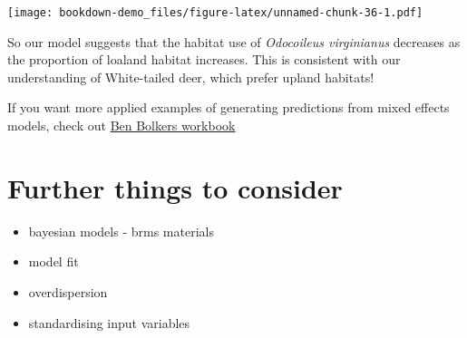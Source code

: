 \documentclass[]{book}
\newenvironment{Shaded}{\begin{snugshade}}{\end{snugshade}}
\newcommand{\KeywordTok}[1]{\textcolor[rgb]{0.13,0.29,0.53}{\textbf{#1}}}
\newcommand{\DataTypeTok}[1]{\textcolor[rgb]{0.13,0.29,0.53}{#1}}
\newcommand{\DecValTok}[1]{\textcolor[rgb]{0.00,0.00,0.81}{#1}}
\newcommand{\StringTok}[1]{\textcolor[rgb]{0.31,0.60,0.02}{#1}}
\newcommand{\CommentTok}[1]{\textcolor[rgb]{0.56,0.35,0.01}{\textit{#1}}}
\newcommand{\OtherTok}[1]{\textcolor[rgb]{0.56,0.35,0.01}{#1}}
\newcommand{\OperatorTok}[1]{\textcolor[rgb]{0.81,0.36,0.00}{\textbf{#1}}}
\newcommand{\NormalTok}[1]{#1}
\providecommand{\tightlist}{%
  \setlength{\itemsep}{0pt}\setlength{\parskip}{0pt}}
\begin{document}
\begin{Shaded}
\end{Shaded}

\texttt{[image: bookdown-demo\_files/figure-latex/unnamed-chunk-36-1.pdf]}

So our model suggests that the habitat use of \emph{Odocoileus
virginianus} decreases as the proportion of loaland habitat increases.
This is consistent with our understanding of White-tailed deer, which
prefer upland habitats!

If you want more applied examples of generating predictions from mixed
effects models, check out
\href{https://bbolker.github.io/mixedmodels-misc/ecostats_chap.html}{Ben
Bolkers workbook}

\section{Further things to consider}\label{further-things-to-consider}

\begin{itemize}
\tightlist
\item
  bayesian models - brms materials
\item
  model fit
\item
  overdispersion
\item
  standardising input variables
\end{itemize}
\end{document}

